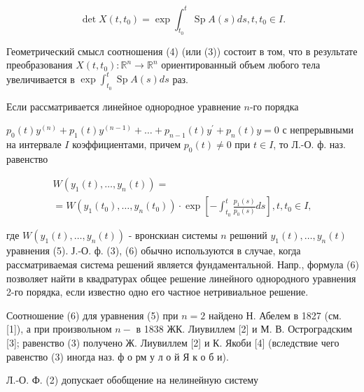 \documentclass[10pt]{article}
\begin{document}
\[

\operatorname{det} X\left(t, t_{0}\right)=\exp \int_{t_{0}}^{t} \operatorname{Sp} A(s) d s, t, t_{0} \in I .

\]



Геометрический смысл соотношения (4) (или (3)) состоит в том, что в результате преобразования $X\left(t, t_{0}\right): \mathbb{R}^{n} \rightarrow \mathbb{R}^{n}$ ориентированный объем любого тела увеличивается в $\exp \int_{t_{0}}^{t} \operatorname{Sp} A(s) d s$ раз.



Если рассматривается линейное однородное уравнение $n$-го порядка



$p_{0}(t) y^{(n)}+p_{1}(t) y^{(n-1)}+\ldots+p_{n-1}(t) y^{\prime}+p_{n}(t) y=0$ с непрерывными на интервале $I$ коэффициентами, причем $p_{0}(t) \neq 0$ при $t \in I$, то Л.-О. ф. наз. равенство



\[

\begin{gathered}

W\left(y_{1}(t), \ldots, y_{n}(t)\right)= \\

=W\left(y_{1}\left(t_{0}\right), \ldots, y_{n}\left(t_{0}\right)\right) \cdot \exp \left[-\int_{t_{0}}^{t} \frac{p_{1}(s)}{p_{0}(s)} d s\right], t, t_{0} \in I,

\end{gathered}

\]



где $W\left(y_{1}(t), \ldots, y_{n}(t)\right)$ - вронскиан системы $n$ решөний $y_{1}(t), \ldots, y_{n}(t)$ уравнения (5). Ј.-О. ф. (3), (6) обычно используются в случае, когда рассматриваемая система решений является фундаментальной. Напр., формула (6) позволяет найти в квадратурах общее решение линейного однородного уравнения 2-го порядка, если известно одно его частное нетривиальное решение.



Соотношение (6) для уравнения (5) при $n=2$ найдено Н. Абелем в 1827 (см. [1]), а при произвольном $n-$ в 1838 ЖК. Лиувиллем [2] и М. В. Остроградским [3]; равенство (3) получено Ж. Лиувиллем [2] и К. Якоби [4] (вследствие чего равенство (3) иногда наз. ф о рм у л о й Я к о б и).



Л.-О. Ф. (2) допускает обобщение на нелинейную систему
\end{document}

